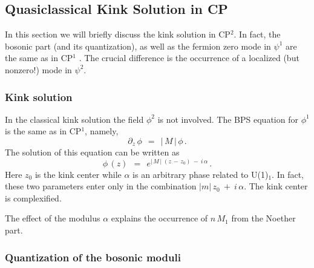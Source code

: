 \documentclass[epsfig,12pt]{article}
\def\beq{\begin{equation}}
\def\eeq{\end{equation}}
\def\beq{\begin{equation}}
\def\eeq{\end{equation}}
\newcommand{\p}{\partial}
\begin{document}
\subsection[Quasiclassical Kink Solution in CP$^2$]
	{Quasiclassical Kink Solution in CP}
\label{kinksolu}

	In this section we will briefly discuss the kink solution in CP$^2$. 
	In fact, the bosonic part (and its quantization), 
	as well as the fermion zero mode in $ \psi^1 $ are the same as in CP$^1$ \cite{SYrev}. 
	The crucial difference is the occurrence of a localized (but nonzero!) mode in $ \psi^2 $.


\subsubsection{Kink solution}

	In the classical kink solution the field $ \phi^2 $ is not involved. 
	The BPS equation for $ \phi^1 $ is the same as in CP$^1$, namely,
\beq
	\p_z\, \phi ~~=~~ |\, M \,| \, \phi\,.
\label{13twentysix}
\eeq
	The solution of this equation  can be written as
\beq
	\phi\, (z)  ~~=~~  e^{ |\, M \,|\; (z \,-\, z_0) ~-~ i\,\alpha}\,.
\label{13twentyseven}
\eeq
	Here $ z_0 $ is the kink center while $ \alpha $ is an arbitrary phase related to U(1)$_1$.
	In fact, these two parameters enter only in the combination
	$ | m |\, z_0 ~+~ i\,\alpha $. The kink center is complexified. 

	The effect of the modulus $ \alpha $ explains the occurrence of 
	$ n\, M_1 $ from the Noether part.



\subsubsection{Quantization of the bosonic moduli}
\end{document}
